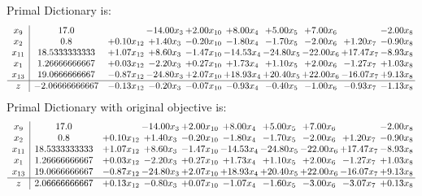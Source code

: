 \documentclass[9pt]{article}
\begin{document}
Primal Dictionary is:
\[\begin{array}{c| c c@{\hskip 2pt} c@{\hskip 2pt} c@{\hskip 2pt} c@{\hskip 2pt} c@{\hskip 2pt} c@{\hskip 2pt} c@{\hskip 2pt} c@{\hskip 2pt} }
 x_{9}   &  17.0  &   & -14.00 x_{3} & +  2.00 x_{10} & +  8.00 x_{4} & +  5.00 x_{5} & +  7.00 x_{6} &   & -2.00 x_{8}\\
 x_{2}   &  0.8 & +  0.10 x_{12} & +  1.40 x_{3} & -0.20 x_{10} & -1.80 x_{4} & -1.70 x_{5} & -2.00 x_{6} & +  1.20 x_{7} & -0.90 x_{8}\\
 x_{11}   &  18.5333333333 & +  1.07 x_{12} & +  8.60 x_{3} & -1.47 x_{10} & -14.53 x_{4} & -24.80 x_{5} & -22.00 x_{6} & + 17.47 x_{7} & -8.93 x_{8}\\
 x_{1}   &  1.26666666667 & +  0.03 x_{12} & -2.20 x_{3} & +  0.27 x_{10} & +  1.73 x_{4} & +  1.10 x_{5} & +  2.00 x_{6} & -1.27 x_{7} & +  1.03 x_{8}\\
 x_{13}   &  19.0666666667 & -0.87 x_{12} & -24.80 x_{3} & +  2.07 x_{10} & + 18.93 x_{4} & + 20.40 x_{5} & + 22.00 x_{6} & -16.07 x_{7} & +  9.13 x_{8}\\
\hline
z    &  -2.06666666667 & -0.13 x_{12} & -0.20 x_{3} & -0.07 x_{10} & -0.93 x_{4} & -0.40 x_{5} & -1.00 x_{6} & -0.93 x_{7} & -1.13 x_{8}\\
\end{array}\]
Primal Dictionary with original objective is:
\[\begin{array}{c| c c@{\hskip 2pt} c@{\hskip 2pt} c@{\hskip 2pt} c@{\hskip 2pt} c@{\hskip 2pt} c@{\hskip 2pt} c@{\hskip 2pt} c@{\hskip 2pt} }
 x_{9}   &  17.0  &   & -14.00 x_{3} & +  2.00 x_{10} & +  8.00 x_{4} & +  5.00 x_{5} & +  7.00 x_{6} &   & -2.00 x_{8}\\
 x_{2}   &  0.8 & +  0.10 x_{12} & +  1.40 x_{3} & -0.20 x_{10} & -1.80 x_{4} & -1.70 x_{5} & -2.00 x_{6} & +  1.20 x_{7} & -0.90 x_{8}\\
 x_{11}   &  18.5333333333 & +  1.07 x_{12} & +  8.60 x_{3} & -1.47 x_{10} & -14.53 x_{4} & -24.80 x_{5} & -22.00 x_{6} & + 17.47 x_{7} & -8.93 x_{8}\\
 x_{1}   &  1.26666666667 & +  0.03 x_{12} & -2.20 x_{3} & +  0.27 x_{10} & +  1.73 x_{4} & +  1.10 x_{5} & +  2.00 x_{6} & -1.27 x_{7} & +  1.03 x_{8}\\
 x_{13}   &  19.0666666667 & -0.87 x_{12} & -24.80 x_{3} & +  2.07 x_{10} & + 18.93 x_{4} & + 20.40 x_{5} & + 22.00 x_{6} & -16.07 x_{7} & +  9.13 x_{8}\\
\hline
z    &  2.06666666667 & +  0.13 x_{12} & -0.80 x_{3} & +  0.07 x_{10} & -1.07 x_{4} & -1.60 x_{5} & -3.00 x_{6} & -3.07 x_{7} & +  0.13 x_{8}\\
\end{array}\]
\end{document}
